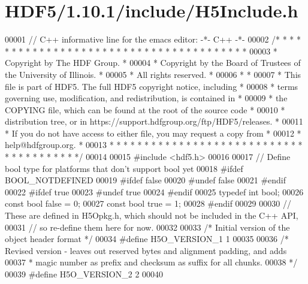 \hypertarget{_h_d_f5_21_810_81_2include_2_h5_include_8h_source}{}\section{H\+D\+F5/1.10.1/include/\+H5\+Include.h}
\label{_h_d_f5_21_810_81_2include_2_h5_include_8h_source}

\begin{DoxyCode}
00001 \textcolor{comment}{// C++ informative line for the emacs editor: -*- C++ -*-}
00002 \textcolor{comment}{/* * * * * * * * * * * * * * * * * * * * * * * * * * * * * * * * * * * * * * *}
00003 \textcolor{comment}{ * Copyright by The HDF Group.                                               *}
00004 \textcolor{comment}{ * Copyright by the Board of Trustees of the University of Illinois.         *}
00005 \textcolor{comment}{ * All rights reserved.                                                      *}
00006 \textcolor{comment}{ *                                                                           *}
00007 \textcolor{comment}{ * This file is part of HDF5.  The full HDF5 copyright notice, including     *}
00008 \textcolor{comment}{ * terms governing use, modification, and redistribution, is contained in    *}
00009 \textcolor{comment}{ * the COPYING file, which can be found at the root of the source code       *}
00010 \textcolor{comment}{ * distribution tree, or in https://support.hdfgroup.org/ftp/HDF5/releases.  *}
00011 \textcolor{comment}{ * If you do not have access to either file, you may request a copy from     *}
00012 \textcolor{comment}{ * help@hdfgroup.org.                                                        *}
00013 \textcolor{comment}{ * * * * * * * * * * * * * * * * * * * * * * * * * * * * * * * * * * * * * * */}
00014 
00015 \textcolor{preprocessor}{#include <hdf5.h>}
00016 
00017 \textcolor{comment}{// Define bool type for platforms that don't support bool yet}
00018 \textcolor{preprocessor}{#ifdef BOOL\_NOTDEFINED}
00019 \textcolor{preprocessor}{#ifdef false}
00020 \textcolor{preprocessor}{#undef false}
00021 \textcolor{preprocessor}{#endif}
00022 \textcolor{preprocessor}{#ifdef true}
00023 \textcolor{preprocessor}{#undef true}
00024 \textcolor{preprocessor}{#endif}
00025 \textcolor{keyword}{typedef} \textcolor{keywordtype}{int} bool;
00026 \textcolor{keyword}{const} \textcolor{keywordtype}{bool}  \textcolor{keyword}{false} = 0;
00027 \textcolor{keyword}{const} \textcolor{keywordtype}{bool}  \textcolor{keyword}{true}  = 1;
00028 \textcolor{preprocessor}{#endif}
00029 
00030 \textcolor{comment}{// These are defined in H5Opkg.h, which should not be included in the C++ API,}
00031 \textcolor{comment}{// so re-define them here for now.}
00032 
00033 \textcolor{comment}{/* Initial version of the object header format */}
00034 \textcolor{preprocessor}{#define H5O\_VERSION\_1    1}
00035 
00036 \textcolor{comment}{/* Revised version - leaves out reserved bytes and alignment padding, and adds}
00037 \textcolor{comment}{ *      magic number as prefix and checksum as suffix for all chunks.}
00038 \textcolor{comment}{ */}
00039 \textcolor{preprocessor}{#define H5O\_VERSION\_2    2}
00040 
\end{DoxyCode}
